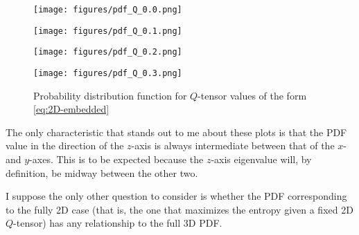 \documentclass[reqno]{article}
\begin{document}
\begin{figure}[H] 
  \centering 
  \begin{minipage}{0.49\textwidth}
    \centering
    \texttt{[image: figures/pdf\_Q\_0.0.png]}
  \end{minipage}
  \begin{minipage}{0.49\textwidth}
    \centering
    \texttt{[image: figures/pdf\_Q\_0.1.png]}
  \end{minipage}
  \begin{minipage}{0.49\textwidth}
    \centering
    \texttt{[image: figures/pdf\_Q\_0.2.png]}
  \end{minipage}
  \begin{minipage}{0.49\textwidth}
    \centering
    \texttt{[image: figures/pdf\_Q\_0.3.png]}
  \end{minipage}
    \caption{Probability distribution function for $Q$-tensor values of the form \eqref{eq:2D-embedded}}
    \label{fig:probability-distribution-functions}
\end{figure}
The only characteristic that stands out to me about these plots is that the PDF value in the direction of the $z$-axis is always intermediate between that of the $x$- and $y$-axes.
This is to be expected because the $z$-axis eigenvalue will, by definition, be midway between the other two.

I suppose the only other question to consider is whether the PDF corresponding to the fully 2D case (that is, the one that maximizes the entropy given a fixed 2D $Q$-tensor) has any relationship to the full 3D PDF.
\end{document}
